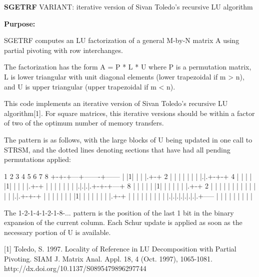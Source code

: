 {\bfseries S\+G\+E\+T\+R\+F} V\+A\+R\+I\+A\+N\+T\+: iterative version of Sivan Toledo's recursive L\+U algorithm 

{\bfseries Purpose\+:} \begin{DoxyVerb} SGETRF computes an LU factorization of a general M-by-N matrix A
 using partial pivoting with row interchanges.

 The factorization has the form
    A = P * L * U
 where P is a permutation matrix, L is lower triangular with unit
 diagonal elements (lower trapezoidal if m > n), and U is upper
 triangular (upper trapezoidal if m < n).

 This code implements an iterative version of Sivan Toledo's recursive
 LU algorithm[1].  For square matrices, this iterative versions should
 be within a factor of two of the optimum number of memory transfers.

 The pattern is as follows, with the large blocks of U being updated
 in one call to STRSM, and the dotted lines denoting sections that
 have had all pending permutations applied:

  1 2 3 4 5 6 7 8
 +-+-+---+-------+------
 | |1|   |       |
 |.+-+ 2 |       |
 | | |   |       |
 |.|.+-+-+   4   |
 | | | |1|       |
 | | |.+-+       |
 | | | | |       |
 |.|.|.|.+-+-+---+  8
 | | | | | |1|   |
 | | | | |.+-+ 2 |
 | | | | | | |   |
 | | | | |.|.+-+-+
 | | | | | | | |1|
 | | | | | | |.+-+
 | | | | | | | | |
 |.|.|.|.|.|.|.|.+-----
 | | | | | | | | |

 The 1-2-1-4-1-2-1-8-... pattern is the position of the last 1 bit in
 the binary expansion of the current column.  Each Schur update is
 applied as soon as the necessary portion of U is available.

 [1] Toledo, S. 1997. Locality of Reference in LU Decomposition with
 Partial Pivoting. SIAM J. Matrix Anal. Appl. 18, 4 (Oct. 1997),
 1065-1081. http://dx.doi.org/10.1137/S0895479896297744\end{DoxyVerb}
 
